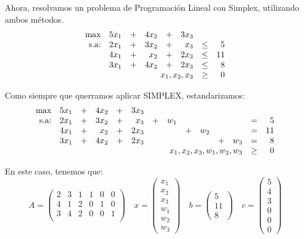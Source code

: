 \documentclass{article}
\begin{document}
    Ahora, resolvamos un problema de Programación Lineal con Simplex, utilizando ambos métodos.
    \[
    \begin{array}{rrrrrrrr}
        \max & 5x_1 & + & 4x_2 & + & 3x_3 & \\
        \text{s.a:} & 2x_1 & + & 3x_2 & + & x_3  & \leq & 5  \\
        & 4x_1 & + & x_2  & + & 2x_3 & \leq & 11 \\
        & 3x_1 & + & 4x_2 & + & 2x_3 & \leq & 8  \\
        & \multicolumn{5}{r}{x_1,x_2,x_3} & \geq & 0 \\
    \end{array}
    \]

    Como siempre que querramos aplicar SIMPLEX, estandarizamos:
    \[
    \begin{array}{rrrrrrrrrrrrrr}
        \max & 5x_1 & + & 4x_2 & + & 3x_3 & \\
        \text{s.a:} & 2x_1 & + & 3x_2 & + & x_3  & + & w_1 &   &     &   &     & = & 5  \\
        & 4x_1 & + & x_2  & + & 2x_3 &   &     & + & w_2 &   &     & = & 11 \\
        & 3x_1 & + & 4x_2 & + & 2x_3 &   &     &   &     & + & w_3 & = & 8  \\
        & \multicolumn{11}{r}{x_1,x_2,x_3,w_1,w_2,w_3} & \geq & 0 \\
    \end{array}\]

    En este caso, tenemos que:
            \[ A =
            \begin{pmatrix}
                    2 & 3 & 1 & 1 & 0 & 0 \\
                    4 & 1 & 2 & 0 & 1 & 0 \\
                    3 & 4 & 2 & 0 & 0 & 1 \\
            \end{pmatrix} \quad x =
            \begin{pmatrix}
                x_1 \\
                x_2 \\
                x_3 \\
                w_1 \\
                w_2 \\
                w_3
            \end{pmatrix} \quad b =
            \begin{pmatrix}
                5 \\
                11 \\
                8
            \end{pmatrix} \quad c =
            \begin{pmatrix}
                5 \\
                4 \\
                3 \\
                0 \\
                0 \\
                0
            \end{pmatrix}
        \]
\end{document}
